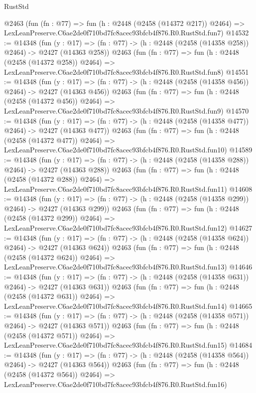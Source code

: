\begin{lexlean}{RustStd}
\begin{coremodule}
    @2463
    (fun (fn : @77) =>
    fun (h : @2448 (@2458 (@14372 @217)) @2464) =>
    LexLeanPreserve.C6ae2de0f710bd7fc8acec93bfcb4f876.R0.RustStd.fun7)
@14532 := @14348
    (fun (y : @17) => (fn : @77) -> (h : @2448 (@2458 (@14358 @258)) @2464) -> @2427 (@14363 @258))
    @2463
    (fun (fn : @77) =>
    fun (h : @2448 (@2458 (@14372 @258)) @2464) =>
    LexLeanPreserve.C6ae2de0f710bd7fc8acec93bfcb4f876.R0.RustStd.fun8)
@14551 := @14348
    (fun (y : @17) => (fn : @77) -> (h : @2448 (@2458 (@14358 @456)) @2464) -> @2427 (@14363 @456))
    @2463
    (fun (fn : @77) =>
    fun (h : @2448 (@2458 (@14372 @456)) @2464) =>
    LexLeanPreserve.C6ae2de0f710bd7fc8acec93bfcb4f876.R0.RustStd.fun9)
@14570 := @14348
    (fun (y : @17) => (fn : @77) -> (h : @2448 (@2458 (@14358 @477)) @2464) -> @2427 (@14363 @477))
    @2463
    (fun (fn : @77) =>
    fun (h : @2448 (@2458 (@14372 @477)) @2464) =>
    LexLeanPreserve.C6ae2de0f710bd7fc8acec93bfcb4f876.R0.RustStd.fun10)
@14589 := @14348
    (fun (y : @17) => (fn : @77) -> (h : @2448 (@2458 (@14358 @288)) @2464) -> @2427 (@14363 @288))
    @2463
    (fun (fn : @77) =>
    fun (h : @2448 (@2458 (@14372 @288)) @2464) =>
    LexLeanPreserve.C6ae2de0f710bd7fc8acec93bfcb4f876.R0.RustStd.fun11)
@14608 := @14348
    (fun (y : @17) => (fn : @77) -> (h : @2448 (@2458 (@14358 @299)) @2464) -> @2427 (@14363 @299))
    @2463
    (fun (fn : @77) =>
    fun (h : @2448 (@2458 (@14372 @299)) @2464) =>
    LexLeanPreserve.C6ae2de0f710bd7fc8acec93bfcb4f876.R0.RustStd.fun12)
@14627 := @14348
    (fun (y : @17) => (fn : @77) -> (h : @2448 (@2458 (@14358 @624)) @2464) -> @2427 (@14363 @624))
    @2463
    (fun (fn : @77) =>
    fun (h : @2448 (@2458 (@14372 @624)) @2464) =>
    LexLeanPreserve.C6ae2de0f710bd7fc8acec93bfcb4f876.R0.RustStd.fun13)
@14646 := @14348
    (fun (y : @17) => (fn : @77) -> (h : @2448 (@2458 (@14358 @631)) @2464) -> @2427 (@14363 @631))
    @2463
    (fun (fn : @77) =>
    fun (h : @2448 (@2458 (@14372 @631)) @2464) =>
    LexLeanPreserve.C6ae2de0f710bd7fc8acec93bfcb4f876.R0.RustStd.fun14)
@14665 := @14348
    (fun (y : @17) => (fn : @77) -> (h : @2448 (@2458 (@14358 @571)) @2464) -> @2427 (@14363 @571))
    @2463
    (fun (fn : @77) =>
    fun (h : @2448 (@2458 (@14372 @571)) @2464) =>
    LexLeanPreserve.C6ae2de0f710bd7fc8acec93bfcb4f876.R0.RustStd.fun15)
@14684 := @14348
    (fun (y : @17) => (fn : @77) -> (h : @2448 (@2458 (@14358 @564)) @2464) -> @2427 (@14363 @564))
    @2463
    (fun (fn : @77) =>
    fun (h : @2448 (@2458 (@14372 @564)) @2464) =>
    LexLeanPreserve.C6ae2de0f710bd7fc8acec93bfcb4f876.R0.RustStd.fun16)

\end{coremodule}
\end{lexlean}
